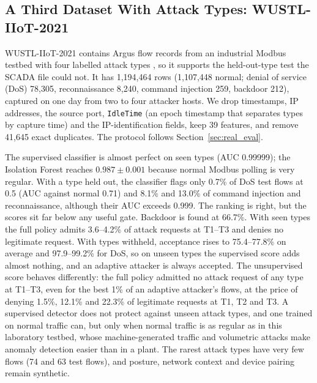 \subsection{A Third Dataset With Attack Types: WUSTL-IIoT-2021}\label{sec:wustl21_eval}
WUSTL-IIoT-2021 contains Argus flow records from an industrial Modbus testbed with four labelled attack types \cite{zolanvari2019vulnerability,zolanvari2021wustl}, so it supports the held-out-type test the SCADA file could not. It has 1{,}194{,}464 rows (1{,}107{,}448 normal; denial of service (DoS) 78{,}305, reconnaissance 8{,}240, command injection 259, backdoor 212), captured on one day from two to four attacker hosts. We drop timestamps, IP addresses, the source port, \texttt{IdleTime} (an epoch timestamp that separates types by capture time) and the IP-identification fields, keep 39 features, and remove 41{,}645 exact duplicates. The protocol follows Section~\ref{sec:real_eval}.

The supervised classifier is almost perfect on seen types (AUC 0.99999); the Isolation Forest reaches $0.987\pm0.001$ because normal Modbus polling is very regular. With a type held out, the classifier flags only 0.7\% of DoS test flows at 0.5 (AUC against normal 0.71) and 8.1\% and 13.0\% of command injection and reconnaissance, although their AUC exceeds 0.999. The ranking is right, but the scores sit far below any useful gate. Backdoor is found at 66.7\%. With seen types the full policy admits 3.6--4.2\% of attack requests at T1--T3 and denies no legitimate request. With types withheld, acceptance rises to 75.4--77.8\% on average and 97.9--99.2\% for DoS, so on unseen types the supervised score adds almost nothing, and an adaptive attacker is always accepted. The unsupervised score behaves differently: the full policy admitted no attack request of any type at T1--T3, even for the best 1\% of an adaptive attacker's flows, at the price of denying 1.5\%, 12.1\% and 22.3\% of legitimate requests at T1, T2 and T3. A supervised detector does not protect against unseen attack types, and one trained on normal traffic can, but only when normal traffic is as regular as in this laboratory testbed, whose machine-generated traffic and volumetric attacks make anomaly detection easier than in a plant. The rarest attack types have very few flows (74 and 63 test flows), and posture, network context and device pairing remain synthetic.

\begin{table}[t]
\centering
\caption{WUSTL-IIoT-2021: legitimate requests allowed and attack requests accepted (\%) under the full policy, as means over four attack types; ``Thr.-only'' is the threshold-only policy on the held-out supervised scores}
\label{tab:wustl21}
\scriptsize
\setlength{\tabcolsep}{2.5pt}

\end{table}

